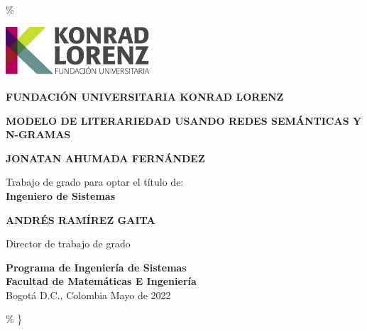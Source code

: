 \documentclass[11pt]{article}
\author{jonatan}
\date{\today}
\title{}
\begin{document}
\tableofcontents

\renewcommand\maketitle\{\begin{titlepage}\%
\begin{center}


  \includegraphics[width=0.4\textwidth]{./assets/LOGO-HORIZONTAL-KONRAD-COLOR.jpg}

  
       \textbf{FUNDACIÓN UNIVERSITARIA KONRAD LORENZ}

       \vfill
       \textbf{MODELO DE LITERARIEDAD USANDO REDES SEMÁNTICAS Y N-GRAMAS}

       \vfill
       

       \textbf{JONATAN AHUMADA FERNÁNDEZ}
       
            
       Trabajo de grado para optar el título de: \\
       \textbf{Ingeniero de Sistemas}

       \vfill

       \textbf{ANDRÉS RAMÍREZ GAITA}

       
       Director de trabajo de grado

       \vfill
     

       \textbf{Programa de Ingeniería de Sistemas}\\
       
       \textbf{Facultad de Matemáticas E Ingeniería}\\
       
       Bogotá D.C., Colombia Mayo de 2022
            
     \end{center}
   \end{titlepage}\%
\}
\end{document}
